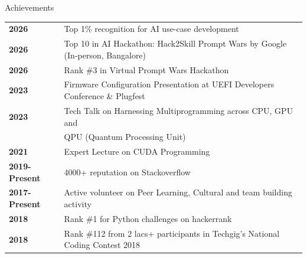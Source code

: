 \documentclass{resume} %
\begin{document}
\begin{rSection}{Achievements}

\begin{tabular}{ @{} >{\bfseries}l @{\hspace{6ex}} l }
2026 & Top 1\% recognition for AI use-case development \\
2026 & Top 10 in AI Hackathon: Hack2Skill Prompt Wars by Google (In-person, Bangalore) \\
2026 & Rank \#3 in Virtual Prompt Wars Hackathon \\
2023 & Firmware Configuration Presentation at UEFI Developers Conference \& Plugfest \\
2023 & Tech Talk on Harnessing Multiprogramming across CPU, GPU and 
\\ & QPU (Quantum Processing Unit) \\
2021 & Expert Lecture on CUDA Programming \\
2019-Present & 4000+ reputation on Stackoverflow \\
2017-Present & Active volunteer on Peer Learning, Cultural and team building activity \\
2018 & Rank \#1 for Python challenges on hackerrank \\
2018 & Rank \#112 from 2 lacs+ participants in Techgig's National Coding Contest 2018 \\

\end{tabular}

\end{rSection}
\end{document}
